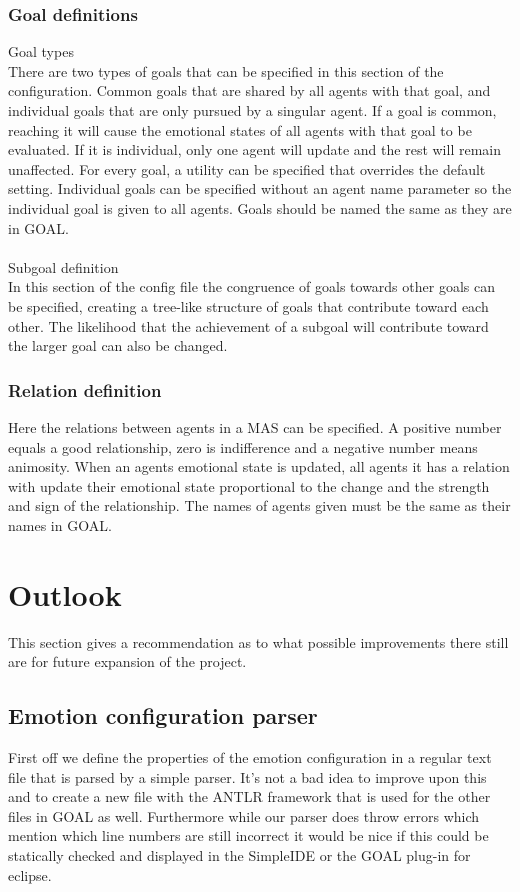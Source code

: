 \documentclass[11pt]{article}
\begin{document}
\subsubsection{Goal definitions}
Goal types\\
There are two types of goals that can be specified in this section of the configuration. Common goals that are shared by all agents with that goal, and individual goals that are only pursued by a singular agent. If a goal is common, reaching it will cause the emotional states of all agents with that goal to be evaluated. If it is individual, only one agent will update and the rest will remain unaffected. For every goal, a utility can be specified that overrides the default setting. Individual goals can be specified without an agent name parameter so the individual goal is given to all agents. Goals should be named the same as they are in GOAL.\\
\\
Subgoal definition\\
In this section of the config file the congruence of goals towards other goals can be specified, creating a tree-like structure of goals that contribute toward each other. The likelihood that the achievement of a subgoal will contribute toward the larger goal can also be changed.
\subsubsection{Relation definition}
Here the relations between agents in a MAS can be specified. A positive number equals a good relationship, zero is indifference and a negative number means animosity. When an agents emotional state is updated, all agents it has a relation with update their emotional state proportional to the change and the strength and sign of the relationship. The names of agents given must be the same as their names in GOAL.


\section{Outlook}
This section gives a recommendation as to what possible improvements there still are for future expansion of the project.

\subsection{Emotion configuration parser}
First off we define the properties of the emotion configuration in a regular text file that is parsed by a simple parser. It's not a bad idea to improve upon this and to create a new file with the ANTLR framework that is used for the other files in GOAL as well. Furthermore while our parser does throw errors which mention which line numbers are still incorrect it would be nice if this could be statically checked and displayed in the SimpleIDE or the GOAL plug-in for eclipse.
\end{document}
